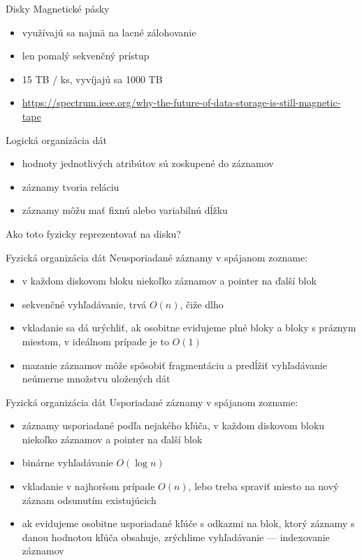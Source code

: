 \documentclass[12pt]{beamer}
\begin{document}
\begin{frame}[fragile]{Disky}
Magnetické pásky
\begin{itemize}
\item využívajú sa najmä na lacné zálohovanie
\item len pomalý sekvenčný prístup
\item 15 TB / ks, vyvíjajú sa 1000 TB
\item {\scriptsize\url{https://spectrum.ieee.org/why-the-future-of-data-storage-is-still-magnetic-tape}}
\end{itemize}
\end{frame}

\begin{frame}[fragile]{Logická organizácia dát}
\begin{itemize}
\item hodnoty jednotlivých atribútov sú zoskupené do záznamov
\item záznamy tvoria reláciu
\item záznamy môžu mať fixnú alebo variabilnú dĺžku
\end{itemize}
Ako toto fyzicky reprezentovať na disku?
\end{frame}

\begin{frame}[fragile]{Fyzická organizácia dát}
Neusporiadané záznamy v spájanom zozname:
\begin{itemize}
\item v každom diskovom bloku niekoľko záznamov a pointer na ďalší blok
\item sekvenčné vyhľadávanie, trvá $O(n)$, čiže dlho
\item vkladanie sa dá urýchliť, ak osobitne evidujeme plné bloky a bloky s práznym miestom, v ideálnom prípade je to $O(1)$
\item mazanie záznamov môže spôsobiť fragmentáciu a predĺžiť vyhľadávanie neúmerne množstvu uložených dát
\end{itemize}
\end{frame}

\begin{frame}[fragile]{Fyzická organizácia dát}
Usporiadané záznamy v spájanom zozname:
\begin{itemize}
\item záznamy usporiadané podľa nejakého kľúča, v každom diskovom bloku niekoľko záznamov a pointer na ďalší blok
\item binárne vyhľadávanie $O(\log n)$
\item vkladanie v najhoršom prípade $O(n)$, lebo treba spraviť miesto na nový záznam odsunutím existujúcich
\item ak evidujeme osobitne usporiadané kľúče s odkazmi na blok, ktorý záznamy s danou hodnotou kľúča obsahuje, zrýchlime vyhľadávanie --- indexovanie záznamov 
\end{itemize}
\end{frame}
\end{document}
